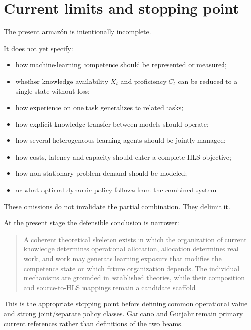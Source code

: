 \section{Current limits and stopping point}

The present armazón is intentionally incomplete.

It does not yet specify:
\begin{itemize}
\item how machine-learning competence should be represented or measured;
\item whether knowledge availability \(K_t\) and proficiency \(C_t\) can be reduced to a
single state without loss;
\item how experience on one task generalizes to related tasks;
\item how explicit knowledge transfer between models should operate;
\item how several heterogeneous learning agents should be jointly managed;
\item how costs, latency and capacity should enter a complete HLS objective;
\item how non-stationary problem demand should be modeled;
\item or what optimal dynamic policy follows from the combined system.
\end{itemize}

These omissions do not invalidate the partial combination. They delimit it.

At the present stage the defensible conclusion is narrower:

\begin{quote}
A coherent theoretical skeleton exists in which the organization of current knowledge
determines operational allocation, allocation determines real work, and work may generate
learning exposure that modifies the competence state on which future organization depends.
The individual mechanisms are grounded in established theories, while their composition and
source-to-HLS mappings remain a candidate scaffold.
\end{quote}

This is the appropriate stopping point before defining common operational value and strong
joint/separate policy classes. Garicano and Gutjahr remain primary current references rather
than definitions of the two beams.
